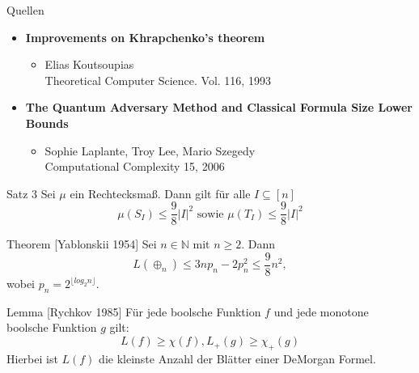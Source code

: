 \documentclass[12pt]{beamer}
\begin{document}
\begin{frame}{}
    \begin{block}{Quellen}
        \begin{itemize}
            \item \textbf{Improvements on Khrapchenko's theorem}
            \begin{itemize}
                \item Elias Koutsoupias\\
                Theoretical Computer Science. Vol. 116, 1993
            \end{itemize}
            \item \textbf{The Quantum Adversary Method and Classical Formula Size Lower Bounds}
            \begin{itemize}
                \item Sophie Laplante, Troy Lee, Mario Szegedy\\
                Computational Complexity 15, 2006
            \end{itemize}
        \end{itemize}
    \end{block}
\end{frame}

\begin{frame}[noframenumbering]{}
        \begin{block}{Satz 3}
        Sei $\mu$ ein Rechtecksma\ss{}. Dann gilt f\"ur alle $I \subseteq [n]$
        \[
            \mu(S_I) \leq \frac{9}{8} |I|^2
        \text{ sowie }
            \mu(T_I) \leq \frac{9}{8} |I|^2
        \]
    \end{block}
     \begin{block}{Theorem [Yablonskii 1954]}
        Sei $n \in \mathbb{N}$ mit $n \geq 2$. Dann
        \[
            L(\oplus_n) \leq 3np_n - 2p_n^2 \leq \frac{9}{8}n^2,
        \]
        wobei $p_n = 2^{\lfloor log_2n\rfloor}$.
    \end{block}
    \begin{block}{Lemma [Rychkov 1985]}
        Für jede boolsche Funktion $f$ und jede monotone boolsche Funktion $g$ gilt:
        \[
            L(f) \geq \chi (f), L_+ (g) \geq \chi_+ (g)
        \]
        Hierbei ist $L(f)$ die kleinste Anzahl der Blätter einer DeMorgan Formel.
    \end{block}
\end{frame}
\end{document}
